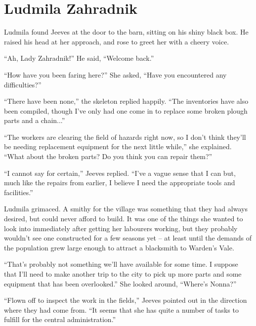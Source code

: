 \chapter{Ludmila Zahradnik}

Ludmila found Jeeves at the door to the barn, sitting on his shiny black box. He raised his head at her approach, and rose to greet her with a cheery voice.

 

“Ah, Lady Zahradnik!” He said, “Welcome back.”

 

“How have you been faring here?” She asked, “Have you encountered any difficulties?”

 

“There have been none,” the skeleton replied happily. “The inventories have also been compiled, though I’ve only had one come in to replace some broken plough parts and a chain...”

 

“The workers are clearing the field of hazards right now, so I don’t think they’ll be needing replacement equipment for the next little while,” she explained. “What about the broken parts? Do you think you can repair them?”

 

“I cannot say for certain,” Jeeves replied. “I’ve a vague sense that I can but, much like the repairs from earlier, I believe I need the appropriate tools and facilities.”

 

Ludmila grimaced. A smithy for the village was something that they had always desired, but could never afford to build. It was one of the things she wanted to look into immediately after getting her labourers working, but they probably wouldn’t see one constructed for a few seasons yet – at least until the demands of the population grew large enough to attract a blacksmith to Warden’s Vale.

 

“That’s probably not something we’ll have available for some time. I suppose that I’ll need to make another trip to the city to pick up more parts and some equipment that has been overlooked.” She looked around, “Where’s Nonna?”

 

“Flown off to inspect the work in the fields,” Jeeves pointed out in the direction where they had come from. “It seems that she has quite a number of tasks to fulfill for the central administration.”

